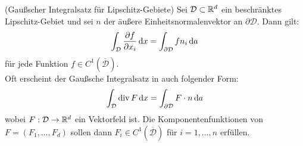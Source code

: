 %	


\begin{Satz} (Gaußscher Integralsatz für Lipschitz-Gebiete) \newline
 	Sei $\mathcal{D}  \subset \mathbb{R}^d$ ein beschränktes Lipschitz-Gebiet und sei $n$ der äußere Einheitsnormalenvektor an $\partial \mathcal{D}$. Dann gilt:
 		\begin{align*}
	 		\int_{\mathcal{D}} \frac{\partial f}{\partial x_i} \, \mathrm{d} x  = \int_{\partial \mathcal{D}} f n_i \, \mathrm{d} a
 		\end{align*}
 		für jede Funktion $f \in C^1(\overline{\mathcal{D}})$. \\ 
 		Oft erscheint der Gaußsche Integralsatz in auch folgender Form:
 		\begin{align*}
 		\int_{\mathcal{D}} \operatorname{div} F \, \mathrm{d} x =  \int_{\partial \mathcal{D}} F \cdot n \, \mathrm{d} a
 		\end{align*}
 		wobei $F:\mathcal{D} \to \mathbb{R}^d$ ein Vektorfeld ist. Die Komponentenfunktionen von $F = (F_1,\dots,F_d)$ sollen dann $F_i \in C^1(\overline{\mathcal{D}})$ für $i=1,\dots,n$ erfüllen.
\end{Satz}

